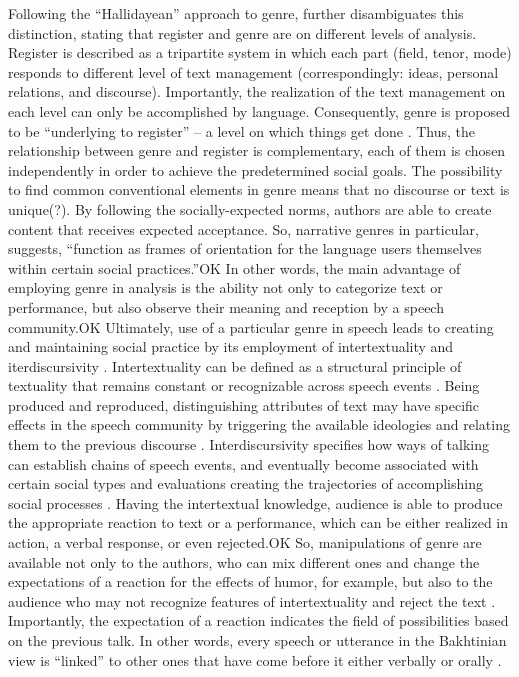 \documentclass[12pt]{turabian-researchpaper}
\begin{document}
Following the ``Hallidayean'' approach to genre, \textcite{swales1990} further disambiguates this distinction, stating that register and genre are on different levels of analysis. Register is described as a tripartite system in which each part (field, tenor, mode) responds to different level of text management (correspondingly: ideas, personal relations, and discourse). Importantly, the realization of the text management on each level can only be accomplished by language. Consequently, genre is proposed to be ``underlying to register'' -- a level on which things get done \parencite[p. 40]{swales1990}. Thus, the relationship between genre and register is complementary, each of them is chosen independently in order to achieve the predetermined social goals.
The possibility to find common conventional elements in genre means that no discourse or text is unique(?). By following the socially-expected norms, authors are able to create content that receives expected acceptance. So, narrative genres in particular, \textcite[p. 181]{hyvarinen2015} suggests, ``function as frames of orientation for the language users themselves within certain social practices.''OK In other words, the main advantage of employing genre in analysis is the ability not only to categorize text or performance, but also observe their meaning and reception by a speech community.OK Ultimately, use of a particular genre in speech leads to creating and maintaining social practice by its employment of intertextuality \parencite{briggs1992} and iterdiscursivity \parencite{wortham2015}. Intertextuality can be defined as a structural principle of textuality that remains constant or recognizable across speech events \parencite{wortham2015}. Being produced and reproduced, distinguishing attributes of text may have specific effects in the speech community by triggering the available ideologies and relating them to the previous discourse \parencite{bakhtin1986}. Interdiscursivity specifies how ways of talking can establish chains of speech events, and eventually become associated with certain social types and evaluations creating the trajectories of accomplishing social processes \parencite{agha2003}. Having the intertextual knowledge, audience is able to produce the appropriate reaction to text or a performance, which can be either realized in action, a verbal response, or even rejected.OK So, manipulations of genre are available not only to the authors, who can mix different ones and change the expectations of a reaction for the effects of humor, for example, but also to the audience who may not recognize features of intertextuality and reject the text \parencite{bax2011}. Importantly, the expectation of a reaction indicates the field of possibilities based on the previous talk. In other words, every speech or utterance in the Bakhtinian view is ``linked'' to other ones that have come before it either verbally or orally \parencite[p. 69]{bakhtin1986}. 
\end{document}
